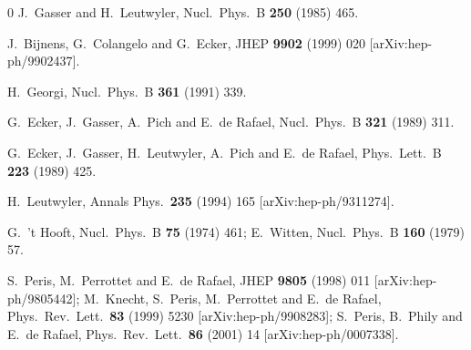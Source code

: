 \documentclass{appolb}
\begin{document}
{\begin{thebibliography}{0}
  J.~Gasser and H.~Leutwyler,
  Nucl.\ Phys.\  B {\bf 250} (1985) 465.
  
  J.~Bijnens, G.~Colangelo and G.~Ecker,
  JHEP {\bf 9902} (1999) 020
  [arXiv:hep-ph/9902437].

  H.~Georgi,
  Nucl.\ Phys.\  B {\bf 361} (1991) 339.

  G.~Ecker, J.~Gasser, A.~Pich and E.~de Rafael,
  Nucl.\ Phys.\  B {\bf 321} (1989) 311.
  
  G.~Ecker, J.~Gasser, H.~Leutwyler, A.~Pich and E.~de Rafael,
  Phys.\ Lett.\  B {\bf 223} (1989) 425.
  
  H.~Leutwyler,
  Annals Phys.\  {\bf 235} (1994) 165
  [arXiv:hep-ph/9311274].
  
  G.~'t Hooft,
  Nucl.\ Phys.\  B {\bf 75} (1974) 461;
  E.~Witten,
  Nucl.\ Phys.\  B {\bf 160} (1979) 57.

  S.~Peris, M.~Perrottet and E.~de Rafael,
  JHEP {\bf 9805} (1998) 011
  [arXiv:hep-ph/9805442];
  M.~Knecht, S.~Peris, M.~Perrottet and E.~de Rafael,
  Phys.\ Rev.\ Lett.\  {\bf 83} (1999) 5230
  [arXiv:hep-ph/9908283];
  S.~Peris, B.~Phily and E.~de Rafael,
  Phys.\ Rev.\ Lett.\  {\bf 86} (2001) 14
  [arXiv:hep-ph/0007338].
    

\end{thebibliography}}
\end{document}

